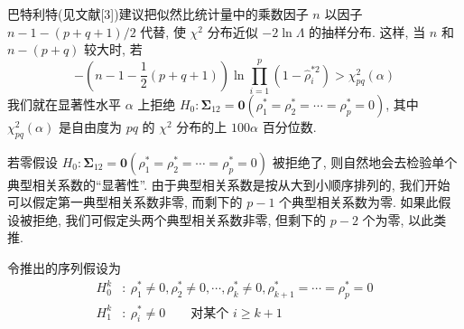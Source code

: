 巴特利特(见文献[3])建议把似然比统计量中的乘数因子 $n$ 以因子 $n-1-(p+q+1)/2$ 代替, 使 $\chi^2$ 分布近似 $-2\ln\Lambda$ 的抽样分布. 这样, 当 $n$ 和 $n-(p+q)$ 较大时, 若
\label{eq:10-39}
\begin{equation}
-\left(n-1-\frac{1}{2}(p+q+1)\right)\ln\prod_{i=1}^{p}(1-\hat{\rho}_i^{*2})>\chi^2_{pq}(\alpha)
\tag{10-39}
\end{equation}
我们就在显著性水平 $\alpha$ 上拒绝 $H_0:\boldsymbol{\Sigma}_{12}=\mathbf{0}(\rho_1^*=\rho_2^*=\cdots=\rho_p^*=0)$, 其中 $\chi^2_{pq}(\alpha)$ 是自由度为 $pq$ 的 $\chi^2$ 分布的上 $100\alpha$ 百分位数.

若零假设 $H_0:\boldsymbol{\Sigma}_{12}=\mathbf{0}(\rho_1^*=\rho_2^*=\cdots=\rho_p^*=0)$ 被拒绝了, 则自然地会去检验单个典型相关系数的“显著性”. 由于典型相关系数是按从大到小顺序排列的, 我们开始可以假定第一典型相关系数非零, 而剩下的 $p-1$ 个典型相关系数为零. 如果此假设被拒绝, 我们可假定头两个典型相关系数非零, 但剩下的 $p-2$ 个为零, 以此类推.

令推出的序列假设为
\label{eq:10-40}
\begin{equation}
\begin{aligned}
H_0^k&:\ \rho_1^*\ne 0,\rho_2^*\ne 0,\cdots,\rho_k^*\ne 0,\rho_{k+1}^*=\cdots=\rho_p^*=0\\
H_1^k&:\ \rho_i^*\ne 0\qquad \text{对某个 } i\ge k+1
\end{aligned}
\tag{10-40}
\end{equation}
